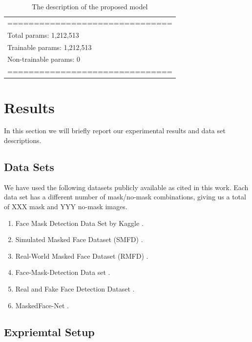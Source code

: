 \documentclass{svproc}
\begin{document}
\begin{table}[]
\begin{tabular}{l}
===============================                                                   \\
Total params: 1,212,513                                                                                                            \\
Trainable params: 1,212,513                                                                                                        \\
Non-trainable params: 0                                                                                                            \\
===============================                                       
\end{tabular}
\caption{The description of the proposed model}
\label{modelTable}
\end{table}

\section{Results}

In this section we will briefly report our experimental results and data set descriptions. 

\subsection{Data Sets}
We have used the following datasets publicly available as cited in this work. Each data set has a different number of mask/no-mask combinations, giving us a total of XXX mask and YYY no-mask images.
\begin{enumerate}
  \item Face Mask Detection Data Set by Kaggle \cite{kagglefacemask}. 
  \item Simulated Masked Face Dataset (SMFD) \cite{smfd}.
  \item Real-World Masked Face Dataset (RMFD) \cite{wang2020masked}.
  \item Face-Mask-Detection Data set \cite{chandrikadeb7}.
  \item Real and Fake Face Detection Dataset \cite{realAndFakeFace}.
  \item MaskedFace-Net \cite{learned2016labeled}.
\end{enumerate}

\subsection{Expriemtal Setup}
\end{document}
